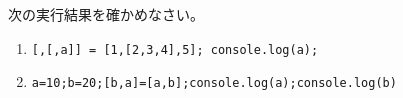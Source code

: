 \begin{Prob}\upshape\Must
 次の実行結果を確かめなさい。
 \begin{enumerate}
  \item \texttt{[,[,a]] = [1,[2,3,4],5]; console.log(a);}
  \item \texttt{a=10;b=20;[b,a]=[a,b];console.log(a);console.log(b)}
 \end{enumerate}
\end{Prob}
